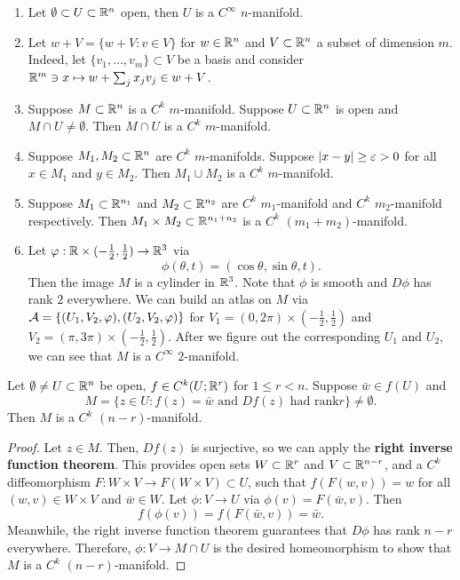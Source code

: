 \documentclass[a4paper]{article}
\begin{document}
\begin{eg}
\begin{enumerate}
\item Let $\emptyset \subset U \subset \mathbb{R}^n$ open, then
$U$ is a $C^\infty$ $n$-manifold.

\item Let $w + V = \{w + V : v \in V\}$ for $w \in \mathbb{R}^n$
and $V \subset \mathbb{R}^n$ a subset of dimension $m$. Indeed,
let $\{v_1, \dots, v_m\} \subset V$ be a basis and consider
$\mathbb{R}^m \ni x \mapsto w + \sum_j x_j v_j \in w + V$.

\item Suppose $M \subset \mathbb{R}^n$ is a $C^k$ $m$-manifold.
Suppose $U \subset \mathbb{R}^n$ is open and $M \cap U \neq
\emptyset$. Then $M \cap U$ is a $C^k$ $m$-manifold.

\item Suppose $M_1, M_2 \subset \mathbb{R}^n$ are $C^k$
$m$-manifolds. Suppose $\left\lvert x - y\right\rvert \geq \varepsilon > 0$ for all
$x \in M_1$ and $y \in M_2$. Then $M_1 \cup M_2$ is a
$C^k$ $m$-manifold.

\item Suppose $M_1 \subset \mathbb{R}^{n_1}$ and $M_2 \subset \mathbb{R}^{n_2}$
are $C^k$ $m_1$-manifold and $C^k$ $m_2$-manifold respectively.
Then $M_1 \times M_2 \subset \mathbb{R}^{n_1 + n_2}$ is a
$C^k$ $(m_1 + m_2)$-manifold.

\item Let $\varphi: \mathbb{R} \times (-\frac{1}{2}, \frac{1}{2})
\to \mathbb{R}^3$ via
\[
\phi(\theta, t) = (\cos \theta, \sin \theta, t).
\]
Then the image $M$ is a cylinder in $\mathbb{R}^3$. Note that $\phi$
is smooth and $D \phi$ has rank $2$ everywhere. We can build
an atlas on $M$ via $\mathcal{A} = \{(U_1, V_2, \varphi), (U_2, V_2, \varphi)\}$
for $V_1 = (0, 2\pi) \times (-\frac{1}{2}, \frac{1}{2})$ and
$V_2 = (\pi, 3\pi) \times (-\frac{1}{2}, \frac{1}{2})$.
After we figure out the corresponding $U_1$ and $U_2$,
we can see that $M$ is a $C^\infty$ $2$-manifold.
\end{enumerate}
\end{eg}

\begin{thm}
Let $\emptyset \neq U \subset \mathbb{R}^n$ be open, $f \in C^k(U;
\mathbb{R}^r)$ for $1 \leq r < n$. Suppose $\bar{w} \in f(U)$ and
\[
M = \{z \in U : f(z) = \bar{w} \text{ and } Df(z) \text{ had rank
$r$}\} \neq \emptyset.
\]
Then $M$ is a $C^k$ $(n-r)$-manifold.
\end{thm}

\begin{proof}
Let $z \in M$. Then, $Df(z)$ is surjective, so we can apply
the \textbf{right inverse function theorem}.  This provides
open sets $W \subset \mathbb{R}^r$ and $V \subset \mathbb{R}^{n-r}$, and
a $C^k$ diffeomorphism
$F : W \times V \to F(W \times V) \subset U$, such that
$f(F(w, v)) = w$ for all $(w, v) \in W \times V$ and
$\bar{w} \in W$. Let $\phi: V \to U$ via
$\phi(v) = F(\bar{w}, v)$. Then
\[
f(\phi(v)) = f(F(\bar{w}, v)) = \bar{w}.
\]
Meanwhile, the right inverse function theorem
guarantees that $D \phi$ has rank $n - r$ everywhere.
Therefore, $\phi: V \to M \cap U$ is the desired
homeomorphism to show that $M$ is a $C^k$ $(n-r)$-manifold.
\end{proof}
\end{document}
